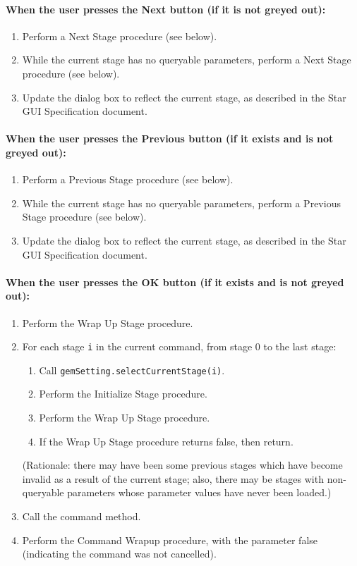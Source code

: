 \documentclass[11pt]{article}
\begin{document}
\paragraph{When the user presses the Next button (if it is not greyed out):}
\begin{enumerate}
\item Perform a Next Stage procedure (see below).
\item While the current stage has no queryable parameters, perform
  a Next Stage procedure (see below).
\item Update the dialog box to reflect the current stage, as described
  in the Star GUI Specification document.
\end{enumerate}

\paragraph{When the user presses the Previous button (if it exists and
  is not greyed out):}
\begin{enumerate}
\item Perform a Previous Stage procedure (see below).
\item While the current stage has no queryable parameters, perform
  a Previous Stage procedure (see below).
\item Update the dialog box to reflect the current stage, as described
  in the Star GUI Specification document.
\end{enumerate}

\paragraph{When the user presses the OK button (if it exists and
  is not greyed out):}
\begin{enumerate}
\item Perform the Wrap Up Stage procedure.
\item For each stage \verb/i/ in the current command, from stage 0 to the
  last stage:
  \begin{enumerate}
  \item Call {\tt gemSetting.selectCurrentStage(i)}.
  \item Perform the Initialize Stage procedure.
  \item Perform the Wrap Up Stage procedure.
  \item If the Wrap Up Stage procedure returns false, then return.
  \end{enumerate}
  (Rationale:  there may have been some previous stages which have
  become invalid as a result of the current stage; also, there may be
  stages with non-queryable parameters whose parameter values have never
  been loaded.)
\item Call the command method.
\item Perform the Command Wrapup procedure, with the parameter false
  (indicating the command was not cancelled).
\end{enumerate}
\end{document}
